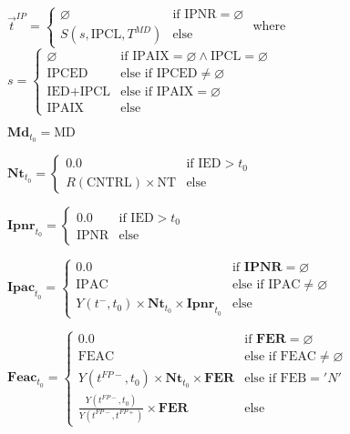 \documentclass[10pt,a4paper,twoside]{article}
\begin{document}
$\boxed{
    \vec{t}^{IP} = 
    \begin{cases}
        \varnothing & \text{if } \text{IPNR} = \varnothing \\
        S(s, \text{IPCL}, T^{MD}) & \text{else}
    \end{cases}
}$
where $s = \begin{cases}
    \varnothing & \text{if } \text{IPAIX} = \varnothing \land \text{IPCL} = \varnothing \\
    \text{IPCED} & \text{else if } \text{IPCED} \neq \varnothing \\
    \text{IED} + \text{IPCL} & \text{else if } \text{IPAIX} = \varnothing \\
    \text{IPAIX} & \text{else}
\end{cases}$

$\boxed{
    \mathbf{Md}_{t_0} = \text{MD}
}$

$\boxed{
    \mathbf{Nt}_{t_0} = 
    \begin{cases}
        0.0 & \text{if } \text{IED} > t_0 \\
        R(\text{CNTRL}) \times \text{NT} & \text{else}
    \end{cases}
}$

$\boxed{
    \mathbf{Ipnr}_{t_0} = 
    \begin{cases}
        0.0 & \text{if } \text{IED} > t_0 \\
        \text{IPNR} & \text{else}
    \end{cases}
}$

$\boxed{
    \mathbf{Ipac}_{t_0} = 
    \begin{cases}
        0.0 & \text{if } \mathbf{IPNR} = \varnothing \\
        \text{IPAC} & \text{else if } \text{IPAC} \neq \varnothing \\
        Y(t^{-}, t_0) \times \mathbf{Nt}_{t_0} \times \mathbf{Ipnr}_{t_0} & \text{else}
    \end{cases}
}$

$\boxed{
    \mathbf{Feac}_{t_0} = 
    \begin{cases}
        0.0 & \text{if } \mathbf{FER} = \varnothing \\
        \text{FEAC} & \text{else if } \text{FEAC} \neq \varnothing \\
        Y(t^{FP-}, t_0) \times \mathbf{Nt}_{t_0} \times \mathbf{FER} & \text{else if } \text{FEB} = 'N' \\
        \frac{Y(t^{FP-}, t_0)}{Y(t^{FP-}, t^{FP+})} \times \mathbf{FER} & \text{else}
    \end{cases}
}$
\end{document}
